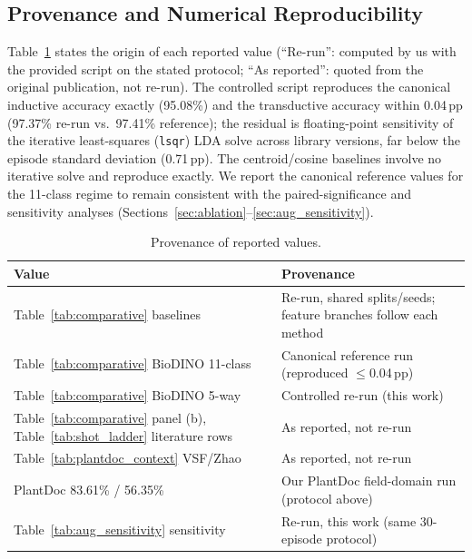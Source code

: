 \documentclass[preprint,12pt]{elsarticle}
\begin{document}
\subsection{Provenance and Numerical Reproducibility}
Table~\ref{tab:provenance} states the origin of each reported value (``Re-run'': computed by us with the provided script on the stated protocol; ``As reported'': quoted from the original publication, not re-run). The controlled script reproduces the canonical inductive accuracy exactly (95.08\%) and the transductive accuracy within 0.04\,pp (97.37\% re-run vs.\ 97.41\% reference); the residual is floating-point sensitivity of the iterative least-squares (\texttt{lsqr}) LDA solve across library versions, far below the episode standard deviation (0.71\,pp). The centroid/cosine baselines involve no iterative solve and reproduce exactly. We report the canonical reference values for the 11-class regime to remain consistent with the paired-significance and sensitivity analyses (Sections~\ref{sec:ablation}--\ref{sec:aug_sensitivity}).

\begin{table}[htbp]
\caption{Provenance of reported values.}
\label{tab:provenance}
\centering

\footnotesize
\begin{tabularx}{\columnwidth}{l X}
\toprule
\textbf{Value} & \textbf{Provenance} \\
\midrule
Table~\ref{tab:comparative} baselines & Re-run, shared splits/seeds; feature branches follow each method \\
Table~\ref{tab:comparative} BioDINO 11-class & Canonical reference run (reproduced $\le$0.04\,pp) \\
Table~\ref{tab:comparative} BioDINO 5-way & Controlled re-run (this work) \\
Table~\ref{tab:comparative} panel (b), Table~\ref{tab:shot_ladder} literature rows & As reported, not re-run \\
Table~\ref{tab:plantdoc_context} VSF/Zhao & As reported, not re-run \\
PlantDoc 83.61\% / 56.35\% & Our PlantDoc field-domain run (protocol above) \\
Table~\ref{tab:aug_sensitivity} sensitivity & Re-run, this work (same 30-episode protocol) \\
\bottomrule
\end{tabularx}
\end{table}

\end{document}

